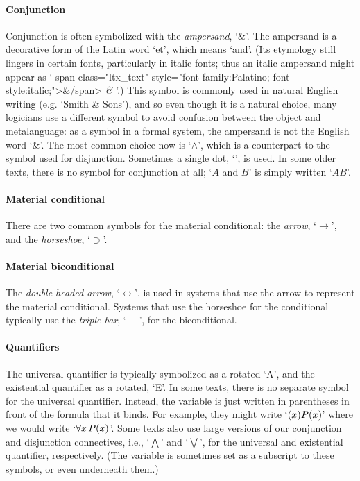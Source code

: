 \paragraph{Conjunction}
Conjunction is often symbolized with the \emph{ampersand}, `{\&}'. The ampersand is a decorative form of the Latin word `et', which means `and'.  (Its etymology still lingers in certain fonts, particularly in italic fonts; thus an italic ampersand might appear as `%
\iflatexml
\<span class="ltx\_text" style="font-family:Palatino; font-style:italic;">\&\</span>
\else
\emph{\&}
\fi
'.) This symbol is commonly used in natural English writing (e.g.  `Smith \& Sons'), and so even though it is a natural choice, many logicians use a different symbol to avoid confusion between the object and metalanguage: as a symbol in a formal system, the ampersand is not the English word `\&'. The most common choice now is `$\wedge$', which is a counterpart to the symbol used for disjunction. Sometimes a single dot, `{\scriptsize\textbullet}', is used. In some older texts, there is no symbol for conjunction at all; `$A$ and $B$' is simply written `$AB$'.

\paragraph{Material conditional} There are two common symbols for the material conditional: the \emph{arrow}, `$\rightarrow$', and the \emph{horseshoe}, `$\supset$'.

\paragraph{Material biconditional} The \emph{double-headed arrow}, `$\leftrightarrow$', is used in systems that use the arrow to represent the material conditional. Systems that use the horseshoe for the conditional typically use the \emph{triple bar}, `$\equiv$', for the biconditional.

\paragraph{Quantifiers} The universal quantifier is typically
symbolized as a rotated `A', and the existential quantifier as a
rotated, `E'. In some texts, there is no separate symbol for the
universal quantifier. Instead, the variable is just written in
parentheses in front of the formula that it binds. For example, they
might write `$(x)P(x)$' where we would write `$\forall x\,
P(x)$'. Some texts also use large versions of our conjunction
and disjunction connectives, i.e., `$\bigwedge$' and `$\bigvee$', for
the universal and existential quantifier, respectively. (The variable
is sometimes set as a subscript to these symbols, or even underneath
them.)

